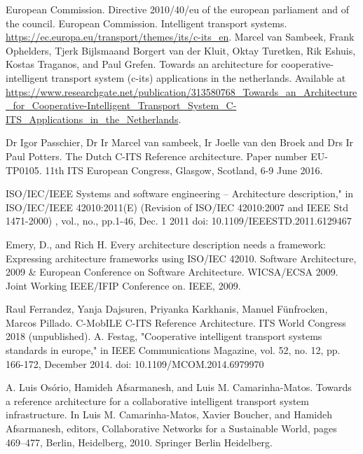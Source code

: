 \documentclass[conference]{IEEEtran}
\begin{document}
\begin{thebibliography}{00}

     European Commission. Directive 2010/40/eu of the european parliament and of the council.
     European Commission. Intelligent transport systems. \url{https://ec.europa.eu/transport/themes/its/c-its_en}.
     Marcel van Sambeek, Frank Ophelders, Tjerk Bijlsmaand Borgert van der Kluit, Oktay Turetken, Rik Eshuis, Kostas Traganos, and Paul Grefen. Towards an architecture for cooperative-intelligent transport system (c-its) applications in the netherlands. Available at \url{ https://www.researchgate.net/publication/313580768_Towards_an_Architecture_for_Cooperative-Intelligent_Transport_System_C-ITS_Applications_in_the_Netherlands}.

	 Dr Igor Passchier, Dr Ir Marcel van sambeek, Ir Joelle van den Broek and Drs Ir Paul Potters. The Dutch C-ITS Reference architecture. Paper number EU-TP0105. 11th ITS European Congress, Glasgow, Scotland, 6-9 June 2016.

     ISO/IEC/IEEE Systems and software engineering -- Architecture description," in ISO/IEC/IEEE 42010:2011(E) (Revision of ISO/IEC 42010:2007 and IEEE Std 1471-2000) , vol., no., pp.1-46, Dec. 1 2011 doi: 10.1109/IEEESTD.2011.6129467
    
    Emery, D., and Rich H. Every architecture description needs a framework: Expressing architecture frameworks using ISO/IEC 42010. Software Architecture, 2009 \& European Conference on Software Architecture. WICSA/ECSA 2009. Joint Working IEEE/IFIP Conference on. IEEE, 2009.
    
    Raul Ferrandez, Yanja Dajsuren, Priyanka Karkhanis, Manuel Fünfrocken, Marcos Pillado. C-MobILE C-ITS Reference Architecture. ITS World Congress 2018 (unpublished).
    A. Festag, "Cooperative intelligent transport systems standards in europe," in IEEE Communications Magazine, vol. 52, no. 12, pp. 166-172, December 2014.  doi: 10.1109/MCOM.2014.6979970
    
     A. Luis Osório, Hamideh Afsarmanesh, and Luis M. Camarinha-Matos. Towards a reference architecture
    for a collaborative intelligent transport system infrastructure. In Luis M. Camarinha-Matos, Xavier Boucher, and Hamideh Afsarmanesh, editors, Collaborative Networks for a Sustainable
    World, pages 469–477, Berlin, Heidelberg, 2010. Springer Berlin Heidelberg.
    

\end{thebibliography}
\end{document}
